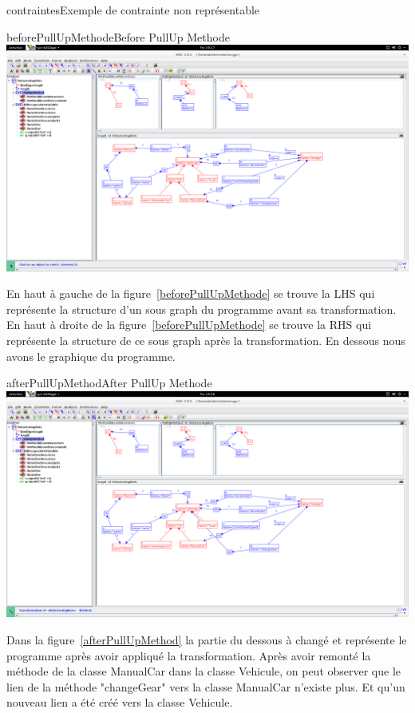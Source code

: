 \documentclass[a4paper, 12pt]{article}
\begin{document}
\begin{figu}{contraintes}{Exemple de contrainte non représentable}
\begin{myfig}{beforePullUpMethode}{Before PullUp Methode}
\includegraphics[width=\textwidth]{beforePullUpMethode.png}
\end{myfig}

En haut à gauche de la figure~\ref{beforePullUpMethode} se trouve la LHS qui représente la structure d'un sous graph du programme avant sa transformation.
En haut à droite de la figure~\ref{beforePullUpMethode} se trouve la RHS qui représente la structure de ce sous graph après la transformation.
En dessous nous avons le graphique du programme.

\begin{myfig}{afterPullUpMethod}{After PullUp Methode}
\includegraphics[width=\textwidth]{afterPullUpMethod.png}
\end{myfig}

Dans la figure~\ref{afterPullUpMethod} la partie du dessous à changé et représente le programme après avoir appliqué la transformation.
Après avoir remonté la méthode de la classe ManualCar dans la classe Vehicule, on peut observer que le lien de la méthode "changeGear" vers la classe ManualCar n'existe plus. Et qu'un nouveau lien a été créé vers la classe Vehicule.


\end{figu}
\end{document}

